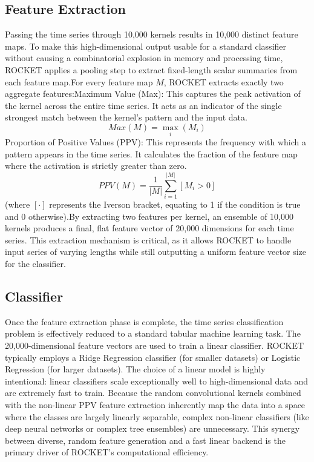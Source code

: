 \subsection{Feature Extraction}
Passing the time series through 10,000 kernels results in 10,000 distinct feature maps. To make this high-dimensional output usable for a standard classifier without causing a combinatorial explosion in memory and processing time, ROCKET applies a pooling step to extract fixed-length scalar summaries from each feature map.For every feature map $M$, ROCKET extracts exactly two aggregate features:Maximum Value (Max): This captures the peak activation of the kernel across the entire time series. It acts as an indicator of the single strongest match between the kernel's pattern and the input data.$$Max(M) = \max_i(M_i)$$Proportion of Positive Values (PPV): This represents the frequency with which a pattern appears in the time series. It calculates the fraction of the feature map where the activation is strictly greater than zero.$$PPV(M) = \frac{1}{|M|} \sum_{i=1}^{|M|} [M_i > 0]$$(where $[ \cdot ]$ represents the Iverson bracket, equating to 1 if the condition is true and 0 otherwise).By extracting two features per kernel, an ensemble of 10,000 kernels produces a final, flat feature vector of 20,000 dimensions for each time series. This extraction mechanism is critical, as it allows ROCKET to handle input series of varying lengths while still outputting a uniform feature vector size for the classifier.

\subsection{Classifier}
Once the feature extraction phase is complete, the time series classification problem is effectively reduced to a standard tabular machine learning task. The 20,000-dimensional feature vectors are used to train a linear classifier.
ROCKET typically employs a Ridge Regression classifier (for smaller datasets) or Logistic Regression (for larger datasets). The choice of a linear model is highly intentional: linear classifiers scale exceptionally well to high-dimensional data and are extremely fast to train. Because the random convolutional kernels combined with the non-linear PPV feature extraction inherently map the data into a space where the classes are largely linearly separable, complex non-linear classifiers (like deep neural networks or complex tree ensembles) are unnecessary. This synergy between diverse, random feature generation and a fast linear backend is the primary driver of ROCKET's computational efficiency.

